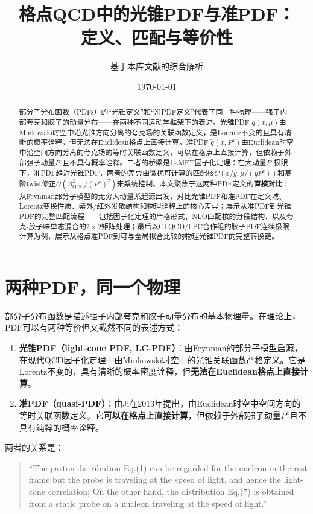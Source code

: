 \documentclass[12pt,a4paper]{ctexart}
\title{\heiti 格点QCD中的光锥PDF与准PDF：\\
定义、匹配与等价性}
\author{基于本库文献的综合解析}
\date{\today}
\theoremstyle{definition}
\begin{document}
\maketitle

\begin{abstract}
\noindent
部分子分布函数（PDFs）的``光锥定义''和``准PDF定义''代表了同一种物理——强子内部夸克和胶子的动量分布——在两种不同运动学框架下的表述。光锥PDF $q(x,\mu)$由Minkowski时空中沿光锥方向分离的夸克场的关联函数定义，是Lorentz不变的且具有清晰的概率诠释，但无法在Euclidean格点上直接计算。准PDF $\tilde{q}(x,P^z)$由Euclidean时空中沿空间方向分离的夸克场的等时关联函数定义，可以在格点上直接计算，但依赖于外部强子动量$P^z$且不具有概率诠释。二者的桥梁是LaMET因子化定理：在大动量$P^z$极限下，准PDF趋近光锥PDF，两者的差异由微扰可计算的匹配核$C(x/y,\mu/(yP^z))$和高阶twist修正$\mathcal{O}(\Lambda^2_{\text{QCD}}/(P^z)^2)$来系统控制。本文聚焦于这两种PDF定义的\textbf{直接对比}：从Feynman部分子模型的无穷大动量系起源出发，对比光锥PDF和准PDF在定义域、Lorentz变换性质、紫外/红外发散结构和物理诠释上的核心差异；展示从准PDF到光锥PDF的完整匹配流程——包括因子化定理的严格形式、NLO匹配核的分段结构、以及夸克-胶子味单态混合的$2\times2$矩阵处理；最后以CLQCD/LPC合作组的胶子PDF连续极限计算为例，展示从格点准PDF到可与全局拟合比较的物理光锥PDF的完整转换链。
\end{abstract}

\tableofcontents
\newpage

\section{两种PDF，同一个物理}

部分子分布函数是描述强子内部夸克和胶子动量分布的基本物理量。在理论上，PDF可以有两种等价但又截然不同的表述方式：

\begin{enumerate}
    \item \textbf{光锥PDF（light-cone PDF, LC-PDF）}：由Feynman的部分子模型启源，在现代QCD因子化定理中由Minkowski时空中的光锥关联函数严格定义。它是Lorentz不变的，具有清晰的概率密度诠释，但\textbf{无法在Euclidean格点上直接计算}。

    \item \textbf{准PDF（quasi-PDF）}：由Ji在2013年提出\cite{Ji2013Euclidean}，由Euclidean时空中空间方向的等时关联函数定义。它\textbf{可以在格点上直接计算}，但依赖于外部强子动量$P^z$且不具有纯粹的概率诠释。
\end{enumerate}

两者的关系是\cite{Ji2014LaMET}：
\begin{quote}
``The parton distribution Eq.(1) can be regarded for the nucleon in the rest frame but the probe is traveling at the speed of light, and hence the light-cone correlation; On the other hand, the distribution Eq.(7) is obtained from a static probe on a nucleon traveling at the speed of light.''
\end{quote}
\end{document}
